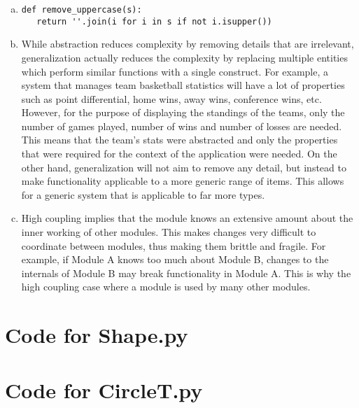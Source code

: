 \documentclass[12pt]{article}
\begin{document}
\begin{enumerate}[a)]
\item 
\begin{lstlisting} 
def remove_uppercase(s):
   return ''.join(i for i in s if not i.isupper())
\end{lstlisting}

\item While abstraction reduces complexity by removing details that are irrelevant, generalization actually reduces the complexity by replacing multiple entities which perform similar functions with a single construct. For example, a system that manages team basketball statistics will have a lot of properties such as point differential, home wins, away wins, conference wins, etc. However, for the purpose of displaying the standings of the teams, only the number of games played, number of wins and number of losses are needed. This means that the team's stats were abstracted and only the properties that were required for the context of the application were needed. On the other hand, generalization will not aim to remove any detail, but instead to make functionality applicable to a more generic range of items. This allows for a generic system that is applicable to far more types. 

\item High coupling implies that the module knows an extensive amount about the inner working of other modules. This makes changes very difficult to coordinate between modules, thus making them brittle and fragile. For example, if Module A knows too much about Module B, changes to the internals of Module B may break functionality in Module A. This is why the high coupling case where a module is used by many other modules.

\end{enumerate}

\newpage

\lstset{language=Python, basicstyle=\tiny, breaklines=true, showspaces=false,
  showstringspaces=false, breakatwhitespace=true}

\def\thesection{\Alph{section}}

\section{Code for Shape.py}

\noindent 

\newpage

\section{Code for CircleT.py}
\end{document}
